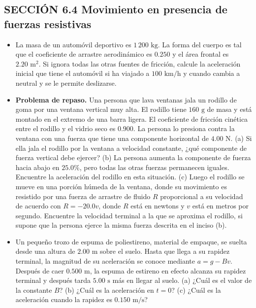 \documentclass[11pt,a4paper]{article}
\begin{document}
\subsection*{SECCIÓN 6.4 Movimiento en presencia de fuerzas resistivas}

\begin{itemize}
    \item[\textbf{18.}] La masa de un automóvil deportivo es $1\,200 \text{ kg}$. La forma del cuerpo es tal que el coeficiente de arrastre aerodinámico es $0.250$ y el área frontal es $2.20 \text{ m}^2$. Si ignora todas las otras fuentes de fricción, calcule la aceleración inicial que tiene el automóvil si ha viajado a $100 \text{ km/h}$ y cuando cambia a neutral y se le permite deslizarse.
    \vspace*{6cm}

    \item[\textbf{19.}] \textbf{Problema de repaso.} Una persona que lava ventanas jala un rodillo de goma por una ventana vertical muy alta. El rodillo tiene $160 \text{ g}$ de masa y está montado en el extremo de una barra ligera. El coeficiente de fricción cinética entre el rodillo y el vidrio seco es $0.900$. La persona lo presiona contra la ventana con una fuerza que tiene una componente horizontal de $4.00 \text{ N}$. (a) Si ella jala el rodillo por la ventana a velocidad constante, ¿qué componente de fuerza vertical debe ejercer? (b) La persona aumenta la componente de fuerza hacia abajo en $25.0\%$, pero todas las otras fuerzas permanecen iguales. Encuentre la aceleración del rodillo en esta situación. (c) Luego el rodillo se mueve en una porción húmeda de la ventana, donde su movimiento es resistido por una fuerza de arrastre de fluido $R$ proporcional a su velocidad de acuerdo con $R = -20.0 v$, donde $R$ está en newtons y $v$ está en metros por segundo. Encuentre la velocidad terminal a la que se aproxima el rodillo, si supone que la persona ejerce la misma fuerza descrita en el inciso (b).
    \vspace*{8cm}

    \item[\textbf{20.}] Un pequeño trozo de espuma de poliestireno, material de empaque, se suelta desde una altura de $2.00 \text{ m}$ sobre el suelo. Hasta que llega a su rapidez terminal, la magnitud de su aceleración se conoce mediante $a = g - Bv$. Después de caer $0.500 \text{ m}$, la espuma de estireno en efecto alcanza su rapidez terminal y después tarda $5.00 \text{ s}$ más en llegar al suelo. (a) ¿Cuál es el valor de la constante $B$? (b) ¿Cuál es la aceleración en $t = 0$? (c) ¿Cuál es la aceleración cuando la rapidez es $0.150 \text{ m/s}$?
    \vspace*{7cm}


\end{itemize}
\end{document}
